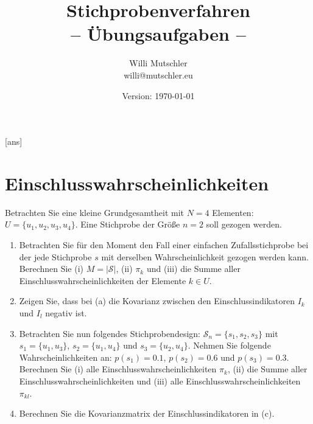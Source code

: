 \documentclass{article}
\begin{document}
	
	\title{Stichprobenverfahren\\ -- Übungsaufgaben --}	
	\author{Willi Mutschler\\willi@mutschler.eu}
	\date{Version: \today}
	\maketitle\thispagestyle{empty}
	\newpage
	[ans]
	
	\setcounter{page}{1}

\section{Einschlusswahrscheinlichkeiten}
Betrachten Sie eine kleine Grundgesamtheit mit $N=4$ Elementen: $U=\{u_1,u_2,u_3,u_4\}$. Eine Stichprobe der Größe $n=2$ soll gezogen werden.
\begin{enumerate}
	\item Betrachten Sie für den Moment den Fall einer einfachen Zufallsstichprobe bei der jede Stichprobe $s$ mit derselben Wahrscheinlichkeit gezogen werden kann. Berechnen Sie (i) $M=|\mathcal{S}|$, (ii) $\pi_k$ und (iii) die Summe aller Einschlusswahrscheinlichkeiten der Elemente $k\in U$.
	\item Zeigen Sie, dass bei (a) die Kovarianz zwischen den Einschlussindikatoren $I_k$ und $I_l$ negativ ist.
	\item Betrachten Sie nun folgendes Stichprobendesign: $\mathcal{S}_n = \{s_1,s_2,s_3\}$ mit $s_1 = \{u_1,u_3\}$, $s_2 = \{u_1,u_4\}$ und $s_3 = \{u_2,u_4\}$. Nehmen Sie folgende Wahrscheinlichkeiten an: $p(s_1)=0.1$, $p(s_2)=0.6$ und $p(s_3)=0.3$. Berechnen Sie (i) alle Einschlusswahrscheinlichkeiten $\pi_k$, (ii) die Summe aller Einschlusswahrscheinlichkeiten und (iii) alle Einschlusswahrscheinlichkeiten $\pi_{kl}$.
	\item Berechnen Sie die Kovarianzmatrix der Einschlussindikatoren in (c).
\end{enumerate}
\end{document}
